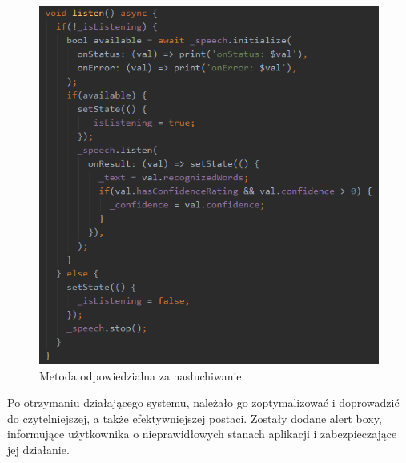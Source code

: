 \documentclass[12pt, a4paper]{article}
\begin{document}
\begin{sloppypar}
{{\begin{figure}[H]
    \includegraphics[width=.9\textwidth]{app_dev_4.PNG}
    \caption{Metoda odpowiedzialna za nasłuchiwanie}
    \label{fig:app4}
  \end{figure}
  Po otrzymaniu działającego systemu, należało go zoptymalizować i doprowadzić do czytelniejszej,
  a także efektywniejszej postaci. Zostały dodane alert boxy, informujące użytkownika
  o nieprawidłowych stanach aplikacji i zabezpieczające jej działanie.

}}
\end{sloppypar}
\end{document}
